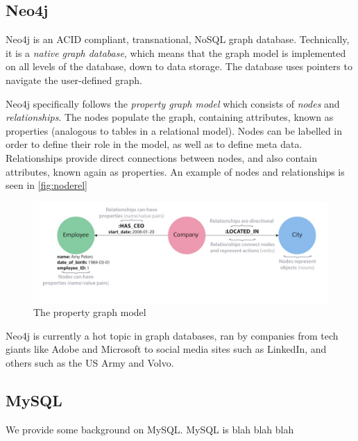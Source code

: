 \documentclass[conference]{IEEEtran}
\begin{document}
\subsection{Neo4j}
Neo4j is an ACID compliant, transnational, NoSQL graph database. Technically, it is a \emph{native graph database}, which means that the graph model is implemented on all levels of the database, down to data storage. The database uses pointers to navigate the user-defined graph\cite{neo4jdef}.

Neo4j specifically follows the \emph{property graph model} which consists of \emph{nodes} and \emph{relationships}. The nodes populate the graph, containing attributes, known as properties (analogous to tables in a relational model). Nodes can be labelled in order to define their role in the model, as well as to define meta data. Relationships provide direct connections between nodes, and also contain attributes, known again as properties. An example of nodes and relationships is seen in \autoref{fig:noderel}
\begin{figure}[h]
   \centering
  \includegraphics[scale=.4]{noderel.png}
 \caption{The property graph model}
\label{fig:noderel}
\end{figure}
\cite{neo4jdef}

Neo4j is currently a hot topic in graph databases, ran by companies from tech giants like Adobe and Microsoft to social media sites such as LinkedIn, and others such as the US Army and Volvo.
\subsection{MySQL}
We provide some background on MySQL. MySQL is blah blah blah
\end{document}
